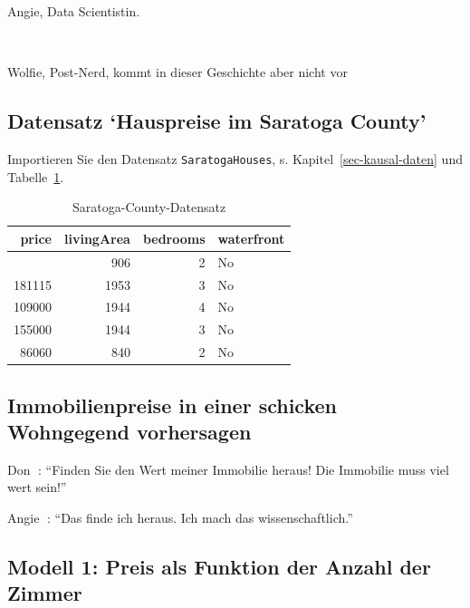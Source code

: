\documentclass[
  ngerman,
  letterpaper,
  twoside,
  open=any]{scrbook}
\theoremstyle{definition}
\theoremstyle{plain}
\theoremstyle{definition}
\theoremstyle{definition}
\theoremstyle{definition}
\theoremstyle{definition}
\theoremstyle{remark}
\begin{document}
Angie, Data Scientistin.

🧞

Wolfie, Post-Nerd, kommt in dieser Geschichte aber nicht vor

\subsection{\texorpdfstring{Datensatz \enquote*{Hauspreise im Saratoga
County}}{Datensatz `Hauspreise im Saratoga County'}}\label{datensatz-hauspreise-im-saratoga-county}

Importieren Sie den Datensatz \texttt{SaratogaHouses}, s.
Kapitel~\ref{sec-kausal-daten} und Tabelle~\ref{tbl-saratoga}.

{

\begin{longtable}[]{@{}rrrl@{}}

\caption{\label{tbl-saratoga}Saratoga-County-Datensatz}

\tabularnewline

\toprule\noalign{}
price & livingArea & bedrooms & waterfront \\
\midrule\noalign{}
\endhead
\bottomrule\noalign{}
\endlastfoot
132500 & 906 & 2 & No \\
181115 & 1953 & 3 & No \\
109000 & 1944 & 4 & No \\
155000 & 1944 & 3 & No \\
86060 & 840 & 2 & No \\

\end{longtable}

}

\subsection{Immobilienpreise in einer schicken Wohngegend
vorhersagen}\label{immobilienpreise-in-einer-schicken-wohngegend-vorhersagen}

Don 🧑: \enquote{Finden Sie den Wert meiner Immobilie heraus! Die
Immobilie muss viel wert sein!}

Angie 👩: \enquote{Das finde ich heraus. Ich mach das wissenschaftlich.}

\subsection{Modell 1: Preis als Funktion der Anzahl der
Zimmer}\label{modell-1-preis-als-funktion-der-anzahl-der-zimmer}
\end{document}
